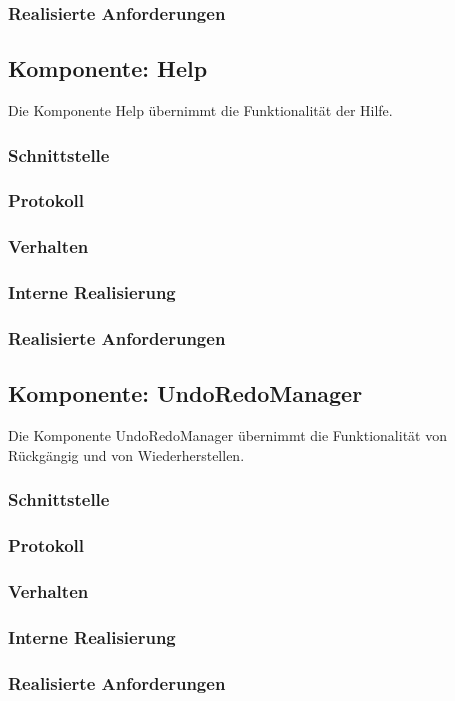 \documentclass[a4paper,12pt]{scrartcl}
\begin{document}
\subsubsection{Realisierte Anforderungen}


\subsection{Komponente: Help}
Die Komponente Help übernimmt die Funktionalität der Hilfe.
\subsubsection{Schnittstelle}
\subsubsection{Protokoll}
\subsubsection{Verhalten}
\subsubsection{Interne Realisierung}
\subsubsection{Realisierte Anforderungen}

\subsection{Komponente: UndoRedoManager}
Die Komponente UndoRedoManager übernimmt die Funktionalität von Rückgängig und von Wiederherstellen.
\subsubsection{Schnittstelle}
\subsubsection{Protokoll}
\subsubsection{Verhalten}
\subsubsection{Interne Realisierung}
\subsubsection{Realisierte Anforderungen}
\end{document}
